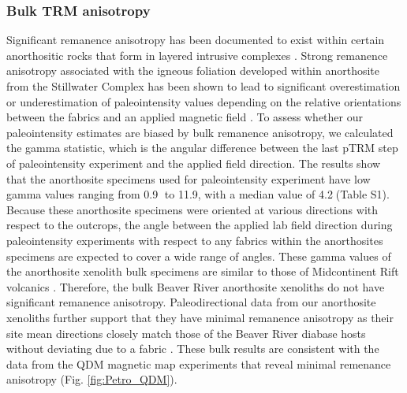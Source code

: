 \documentclass[9pt,twocolumn,twoside,lineno]{pnas-new}
\begin{document}
\subsubsection*{Bulk TRM anisotropy}
Significant remanence anisotropy has been documented to exist within certain anorthositic rocks that form in layered intrusive complexes \cite{Selkin2000a, Feinberg2006a}. Strong remanence anisotropy associated with the igneous foliation developed within anorthosite from the Stillwater Complex has been shown to lead to significant overestimation or underestimation of paleointensity values depending on the relative orientations between the fabrics and an applied magnetic field \cite{Selkin2000a}. To assess whether our paleointensity estimates are biased by bulk remanence anisotropy, we calculated the gamma statistic, which is the angular difference between the last pTRM step of paleointensity experiment and the applied field direction. The results show that the anorthosite specimens used for paleointensity experiment have low gamma values ranging from 0.9\textdegree$\;$ to 11.9\textdegree, with a median value of 4.2\textdegree$\;$(Table S1). Because these anorthosite specimens were oriented at various directions with respect to the outcrops, the angle between the applied lab field direction during paleointensity experiments with respect to any fabrics within the anorthosites specimens are expected to cover a wide range of angles. These gamma values of the anorthosite xenolith bulk specimens are similar to those of Midcontinent Rift volcanics \cite{Sprain2018a}. Therefore, the bulk Beaver River anorthosite xenoliths do not have significant remanence anisotropy. Paleodirectional data from our anorthosite xenoliths further support that they have minimal remanence anisotropy as their site mean directions closely match those of the Beaver River diabase hosts without deviating due to a fabric \cite{Zhang2021b}. These bulk results are consistent with the data from the QDM magnetic map experiments that reveal minimal remenance anisotropy (Fig. \ref{fig:Petro_QDM}). 
\end{document}
